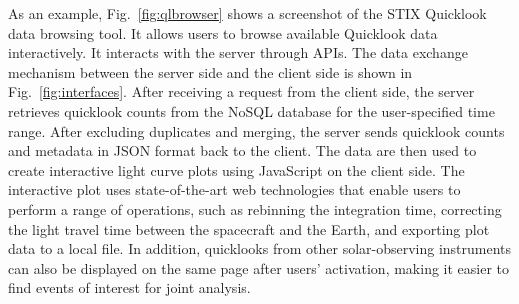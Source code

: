 \documentclass[referee]{preaa} %
\begin{document}
As an example, Fig.~\ref{fig:qlbrowser} shows a screenshot of the STIX Quicklook data browsing 
tool. It allows users to browse available Quicklook data interactively. It 
interacts with the server through APIs.
The data exchange mechanism between the server side and the client side is shown in  
Fig.~\ref{fig:interfaces}. 
After receiving a request from the client side, the server retrieves quicklook counts from the NoSQL database for the user-specified time range. 
After excluding duplicates and merging,  the server sends quicklook counts and metadata in JSON format back to the client. The data are then used to create interactive light curve plots using JavaScript on the client side. 
The interactive plot uses state-of-the-art web technologies that enable users to perform a range of operations, such as rebinning the integration time, correcting the light travel time between the spacecraft and the Earth, and exporting plot data to a local file.
In addition, quicklooks from other solar-observing instruments can also be displayed on the same page after users' activation, 
making it easier to find events of interest for joint analysis.
\end{document}
